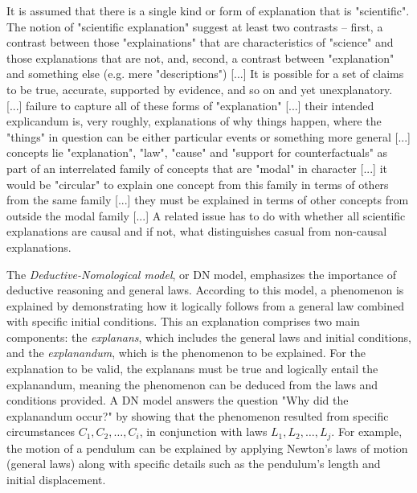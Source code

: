{\color{red}

It is assumed that there is a single kind or form of explanation that is "scientific". The notion of "scientific explanation" suggest at least two contrasts -- first, a contrast between those "explainations" that are characteristics of "science" and those explanations that are not, and, second, a contrast between "explanation" and something else  (e.g. mere "descriptions") [...] It is possible for a set of claims to be true, accurate, supported by evidence, and so on and yet unexplanatory. [...] failure to capture all of these forms of "explanation" [...] their intended explicandum is, very roughly, explanations of why things happen, where the "things" in question can be either particular events or something more general [...] concepts lie "explanation", "law", "cause" and "support for counterfactuals" as part of an interrelated family of concepts that are "modal" in character [...] it would be "circular" to explain one concept from this family in terms of others from the same family [...] they must be explained in terms of other concepts from outside the modal family [...] A related issue has to do with whether all scientific explanations are causal and if not, what distinguishes casual from non-causal explanations.

}

The \emph{Deductive-Nomological model}, or DN model, emphasizes the importance of deductive reasoning and general laws. According to this model, a phenomenon is explained by demonstrating how it logically follows from a general law combined with specific initial conditions. This an explanation comprises two main components: the \emph{explanans}, which includes the general laws and initial conditions, and the \emph{explanandum}, which is the phenomenon to be explained. For the explanation to be valid, the explanans must be true and logically entail the explanandum, meaning the phenomenon can be deduced from the laws and conditions provided. A DN model answers the question "Why did the explanandum occur?" by showing that the phenomenon resulted from specific circumstances $C_1, C_2, \ldots, C_i$, in conjunction with laws $L_1, L_2, \ldots, L_j$. For example, the motion of a pendulum can be explained by applying Newton's laws of motion (general laws) along with specific details such as the pendulum's length and initial displacement.

